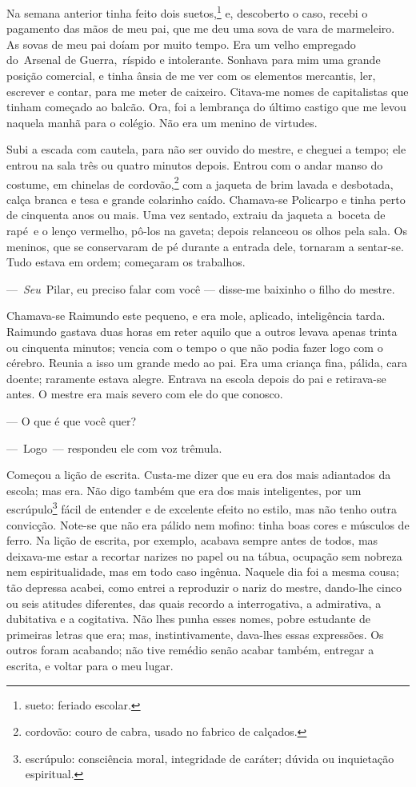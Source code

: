 Na semana anterior tinha feito dois suetos,\footnote{sueto: feriado
  escolar.} e, descoberto o caso, recebi o pagamento das mãos de meu
pai, que me deu uma sova de vara de marmeleiro. As sovas de meu pai
doíam por muito tempo. Era um velho empregado do~Arsenal de
Guerra,~ríspido e intolerante. Sonhava para mim uma grande posição
comercial, e tinha ânsia de me ver com os elementos mercantis, ler,
escrever e contar, para me meter de caixeiro. Citava-me nomes de
capitalistas que tinham começado ao balcão. Ora, foi a lembrança do
último castigo que me levou naquela manhã para o colégio. Não era um
menino de virtudes.

Subi a escada com cautela, para não ser ouvido do mestre, e cheguei a
tempo; ele entrou na sala três ou quatro minutos depois. Entrou com o
andar manso do costume, em chinelas de cordovão,\footnote{cordovão:
  couro de cabra, usado no fabrico de calçados.} com a jaqueta de brim
lavada e desbotada, calça branca e tesa e grande colarinho caído.
Chamava-se Policarpo e tinha perto de cinquenta anos ou mais. Uma vez
sentado, extraiu da jaqueta a~boceta de rapé~e o lenço vermelho, pô-los
na gaveta; depois relanceou os olhos pela sala. Os meninos, que se
conservaram de pé durante a entrada dele, tornaram a sentar-se. Tudo
estava em ordem; começaram os trabalhos.

---~\emph{Seu}~Pilar, eu preciso falar com você --- disse-me baixinho o
filho do mestre.

Chamava-se Raimundo este pequeno, e era mole, aplicado, inteligência
tarda. Raimundo gastava duas horas em reter aquilo que a outros levava
apenas trinta ou cinquenta minutos; vencia com o tempo o que não podia
fazer logo com o cérebro. Reunia a isso um grande medo ao pai. Era uma
criança fina, pálida, cara doente; raramente estava alegre. Entrava na
escola depois do pai e retirava-se antes. O mestre era mais severo com
ele do que conosco.

--- O que é que você quer?

---~Logo~--- respondeu ele com voz trêmula.

Começou a lição de escrita. Custa-me dizer que eu era dos mais
adiantados da escola; mas era. Não digo também que era dos mais
inteligentes, por um escrúpulo\footnote{escrúpulo: consciência moral,
  integridade de caráter; dúvida ou inquietação espiritual.} fácil de
entender e de excelente efeito no estilo, mas não tenho outra convicção.
Note-se que não era pálido nem mofino: tinha boas cores e músculos de
ferro. Na lição de escrita, por exemplo, acabava sempre antes de todos,
mas deixava-me estar a recortar narizes no papel ou na tábua, ocupação
sem nobreza nem espiritualidade, mas em todo caso ingênua. Naquele dia
foi a mesma cousa; tão depressa acabei, como entrei a reproduzir o nariz
do mestre, dando-lhe cinco ou seis atitudes diferentes, das quais
recordo a interrogativa, a admirativa, a dubitativa e a cogitativa. Não
lhes punha esses nomes, pobre estudante de primeiras letras que era;
mas, instintivamente, dava-lhes essas expressões. Os outros foram
acabando; não tive remédio senão acabar também, entregar a escrita, e
voltar para o meu lugar.

